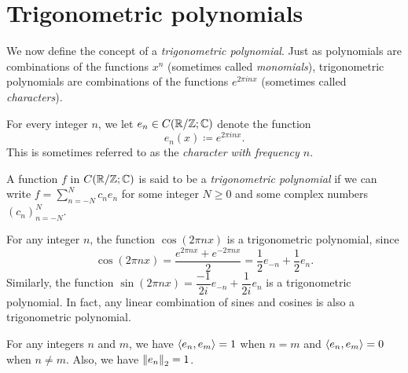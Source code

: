 \section{Trigonometric polynomials}\label{ii:sec:5.3}

\begin{note}
  We now define the concept of a \emph{trigonometric polynomial}.
  Just as polynomials are combinations of the functions \(x^n\) (sometimes called \emph{monomials}), trigonometric polynomials are combinations of the functions \(e^{2 \pi i n x}\) (sometimes called \emph{characters}).
\end{note}

\begin{defn}[Characters]\label{ii:5.3.1}
  For every integer \(n\), we let \(e_n \in C(\R / \Z ; \C)\) denote the function
  \[
    e_n(x) \coloneqq e^{2 \pi i n x}.
  \]
  This is sometimes referred to as the \emph{character with frequency \(n\)}.
\end{defn}

\begin{defn}\label{ii:5.3.2}
  A function \(f\) in \(C(\R / \Z ; \C)\) is said to be a \emph{trigonometric polynomial} if we can write
  \(f = \sum_{n = -N}^N c_n e_n\) for some integer \(N \geq 0\) and some complex numbers \((c_n)_{n = -N}^N\).
\end{defn}

\setcounter{thm}{3}
\begin{eg}\label{ii:5.3.4}
  For any integer \(n\), the function \(\cos(2 \pi n x)\) is a trigonometric polynomial, since
  \[
    \cos(2 \pi n x) = \dfrac{e^{2 \pi n x} + e^{- 2 \pi n x}}{2} = \dfrac{1}{2} e_{-n} + \dfrac{1}{2} e_n.
  \]
  Similarly, the function \(\sin(2 \pi n x) = \dfrac{-1}{2i} e_{-n} + \dfrac{1}{2i} e_n\) is a trigonometric polynomial.
  In fact, any linear combination of sines and cosines is also a trigonometric polynomial.
\end{eg}

\begin{lem}\label{ii:5.3.5}
  For any integers \(n\) and \(m\), we have \(\inner*{e_n, e_m} = 1\) when \(n = m\) and \(\inner*{e_n, e_m} = 0\) when \(n \neq m\).
  Also, we have \(\norm*{e_n}_2 = 1\).
\end{lem}

